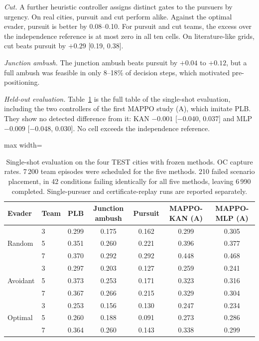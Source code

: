 \documentclass[preprint,12pt]{elsarticle}
\begin{document}
\emph{Cut.} A further heuristic controller assigns distinct gates to the pursuers by urgency. On real cities, pursuit
and cut perform alike. Against the optimal evader, pursuit is better by 0.08--0.10. For pursuit and cut teams, the
excess over the independence reference is at most zero in all ten cells. On literature-like grids, cut beats pursuit
by $+0.29$ [0.19, 0.38].

\emph{Junction ambush.} The junction ambush beats pursuit by $+0.04$ to $+0.12$, but a full ambush was feasible in only
8--18\% of decision steps, which motivated pre-positioning.

\emph{Held-out evaluation.} Table~\ref{tab:s-test} is the full table of the single-shot evaluation, including the two
controllers of the first MAPPO study (A), which imitate PLB. They show no detected difference from it: KAN $-0.001$
[$-$0.040, 0.037] and MLP $-0.009$ [$-$0.048, 0.030]. No cell exceeds the independence reference.

\begin{table}[!h]
\centering
\caption{Single-shot evaluation on the four TEST cities with frozen methods. OC capture rates. 7\,200 team episodes
were scheduled for the five methods. 210 failed scenario placement, in 42 conditions failing identically for all five
methods, leaving 6\,990 completed. Single-pursuer and certificate-replay runs are reported separately.}
\label{tab:s-test}
\begin{adjustbox}{max width=\textwidth}
\begin{tabular}{@{}llccccc@{}}
\toprule
Evader & Team & PLB & Junction ambush & Pursuit & MAPPO-KAN (A) & MAPPO-MLP (A) \\
\midrule
\multirow{3}{*}{Random} & 3 & 0.299 & 0.175 & 0.162 & 0.299 & 0.305 \\
& 5 & 0.351 & 0.260 & 0.221 & 0.396 & 0.377 \\
& 7 & 0.370 & 0.292 & 0.292 & 0.448 & 0.468 \\
\midrule
\multirow{3}{*}{Avoidant} & 3 & 0.297 & 0.203 & 0.127 & 0.259 & 0.241 \\
& 5 & 0.373 & 0.253 & 0.171 & 0.323 & 0.316 \\
& 7 & 0.367 & 0.266 & 0.215 & 0.329 & 0.304 \\
\midrule
\multirow{3}{*}{Optimal} & 3 & 0.253 & 0.156 & 0.130 & 0.247 & 0.234 \\
& 5 & 0.260 & 0.188 & 0.091 & 0.273 & 0.286 \\
& 7 & 0.364 & 0.260 & 0.143 & 0.338 & 0.299 \\
\bottomrule
\end{tabular}
\end{adjustbox}
\end{table}
\end{document}
